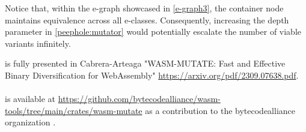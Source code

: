 Notice that, within the e-graph showcased in \autoref{e-graph3}, the container node maintains equivalence across all e-classes. 
Consequently, increasing the depth parameter in \autoref{peephole:mutator} would potentially escalate the number of viable variants infinitely.



\begin{tcolorbox}[title=Contribution paper and artifact,boxrule=1pt,arc=.2em,boxsep=1.0mm]
  \tool is fully presented in Cabrera-Arteaga \etal "WASM-MUTATE: Fast and Effective Binary Diversification for WebAssembly"
 \url{https://arxiv.org/pdf/2309.07638.pdf}.
  \\\\
  \tool is available at \url{https://github.com/bytecodealliance/wasm-tools/tree/main/crates/wasm-mutate} as a contribution to the bytecodealliance organization \cite{bytecode}.
\end{tcolorbox}